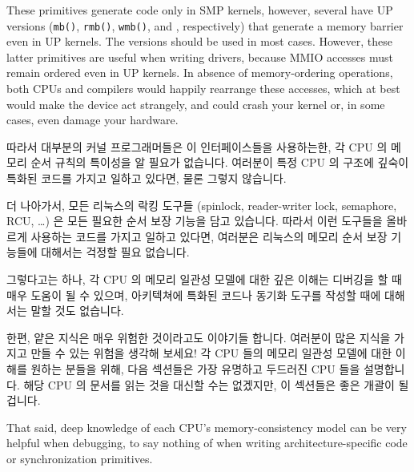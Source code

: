 These primitives generate code only in SMP kernels, however, several
have UP versions ({\tt mb()}, {\tt rmb()}, {\tt wmb()},
and ,
respectively) that generate a memory barrier even in UP kernels. The 
versions should be used in most cases. However, these latter primitives
are useful when writing drivers, because MMIO accesses must remain
ordered even in UP kernels. In absence of memory-ordering operations,
both CPUs and compilers would happily rearrange these accesses, which at
best would make the device act strangely, and could crash your kernel or,
in some cases, even damage your hardware.
\fi

따라서 대부분의 커널 프로그래머들은 이 인터페이스들을 사용하는한, 각 CPU 의
메모리 순서 규칙의 특이성을 알 필요가 없습니다.
여러분이 특정 CPU 의 구조에 깊숙이 특화된 코드를 가지고 일하고 있다면, 물론
그렇지 않습니다.

더 나아가서, 모든 리눅스의 락킹 도구들 (spinlock, reader-writer lock,
semaphore, RCU, \ldots) 은 모든 필요한 순서 보장 기능을 담고 있습니다.
따라서 이런 도구들을 올바르게 사용하는 코드를 가지고 일하고 있다면, 여러분은
리눅스의 메모리 순서 보장 기능들에 대해서는 걱정할 필요 없습니다.

그렇다고는 하나, 각 CPU 의 메모리 일관성 모델에 대한 깊은 이해는 디버깅을 할 때
매우 도움이 될 수 있으며, 아키텍쳐에 특화된 코드나 동기화 도구를 작성할 때에
대해서는 말할 것도 없습니다.

한편, 얕은 지식은 매우 위험한 것이라고도 이야기들 합니다.
여러분이 많은 지식을 가지고 만들 수 있는 위험을 생각해 보세요!
각 CPU 들의 메모리 일관성 모델에 대한 이해를 원하는 분들을 위해, 다음 섹션들은
가장 유명하고 두드러진 CPU 들을 설명합니다.
해당 CPU 의 문서를 읽는 것을 대신할 수는 없겠지만, 이 섹션들은 좋은 개괄이 될
겁니다.
\iffalse

That said, deep knowledge of each CPU's memory-consistency model
can be very helpful when debugging, to say nothing of when writing
architecture-specific code or synchronization primitives.

